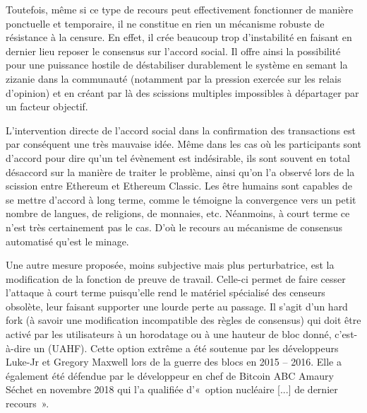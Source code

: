 Toutefois, même si ce type de recours peut effectivement fonctionner de manière ponctuelle et temporaire, il ne constitue en rien un mécanisme robuste de résistance à la censure. En effet, il crée beaucoup trop d'instabilité en faisant en dernier lieu reposer le consensus sur l'accord social. Il offre ainsi la possibilité pour une puissance hostile de déstabiliser durablement le système en semant la zizanie dans la communauté (notamment par la pression exercée sur les relais d'opinion) et en créant par là des scissions multiples impossibles à départager par un facteur objectif.

\clearpage
L'intervention directe de l'accord social dans la confirmation des transactions est par conséquent une très mauvaise idée. Même dans les cas où les participants sont d'accord pour dire qu'un tel évènement est indésirable, ils sont souvent en total désaccord sur la manière de traiter le problème, ainsi qu'on l'a observé lors de la scission entre Ethereum et Ethereum Classic. Les être humains sont capables de se mettre d'accord à long terme, comme le témoigne la convergence vers un petit nombre de langues, de religions, de monnaies, etc. Néanmoins, à court terme ce n'est très certainement pas le cas. D'où le recours au mécanisme de consensus automatisé qu'est le minage.


Une autre mesure proposée, moins subjective mais plus perturbatrice, est la modification de la fonction de preuve de travail. Celle-ci permet de faire cesser l'attaque à court terme puisqu'elle rend le matériel spécialisé des censeurs obsolète, leur faisant supporter une lourde perte au passage. Il s'agit d'un hard fork (à savoir une modification incompatible des règles de consensus) qui doit être activé par les utilisateurs à un horodatage ou à une hauteur de bloc donné, c'est-à-dire un  (UAHF). Cette option extrême a été soutenue par les développeurs Luke-Jr et Gregory Maxwell lors de la guerre des blocs en 2015 -- 2016. Elle a également été défendue par le développeur en chef de Bitcoin ABC Amaury Séchet en novembre 2018 qui l'a qualifiée d'«~option nucléaire [...] de dernier recours~».

